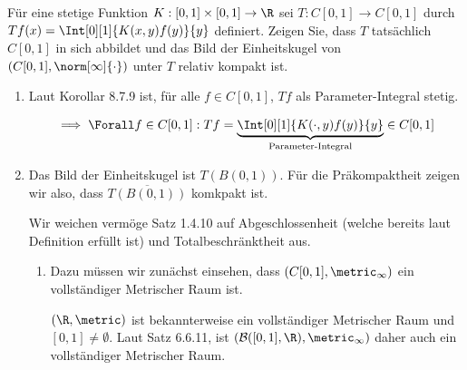 
\begin{exercise}

Für eine stetige Funktion $K: [0, 1] \times [0, 1] \to \R$ sei $T: C[0, 1] \to C[0, 1]$ durch $Tf(x) = \Int[0][1]{K(x, y) f(y)}{y}$ definiert.
Zeigen Sie, dass $T$ tatsächlich $C[0, 1]$ in sich abbildet und das Bild der Einheitskugel von $(C[0, 1], \norm[\infty]{\cdot})$ unter $T$ relativ kompakt ist.

\end{exercise}


\begin{solution}

\phantom{}

\begin{enumerate}

    \item Laut Korollar 8.7.9 ist, für alle $f \in C[0, 1]$, $Tf$ als Parameter-Integral stetig.
    

    \begin{align*}
        \implies
        \Forall f \in C[0, 1]:
        Tf
        =
        \underbrace
        {
            \Int[0][1]{K(\cdot, y) f(y)}{y}
        }_\text{Parameter-Integral}
        \in
        C[0, 1]
    \end{align*}

    \item Das Bild der Einheitskugel ist $T(B(0, 1))$.
    Für die Präkompaktheit zeigen wir also, dass $\overline{T(B(0, 1))}$ komkpakt ist.

    Wir weichen vermöge Satz 1.4.10 auf Abgeschlossenheit (welche bereits laut Definition erfüllt ist) und Totalbeschränktheit aus.


    \begin{enumerate}

        \item Dazu müssen wir zunächst einsehen, dass $(C[0, 1], \metric_\infty)$ ein vollständiger Metrischer Raum ist.


        $(\R, \metric)$ ist bekannterweise ein vollständiger Metrischer Raum und $[0, 1] \neq \emptyset$.
        Laut Satz 6.6.11, ist $(\mathcal{B}([0, 1], \R), \metric_\infty)$ daher auch ein vollständiger Metrischer Raum.
        

\end{enumerate}
\end{enumerate}
\end{solution}
